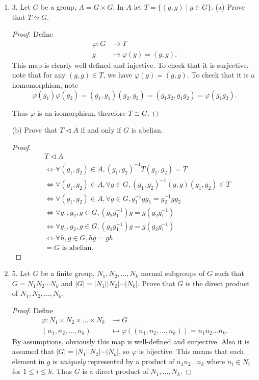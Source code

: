 \begin{enumerate}[resume]
	\item 3. Let $G$ be a group, $A=G \times G$. In $A$ let $T=\{(g, g) \mid g \in G\}$.
(a) Prove that $T \simeq G$.
\begin{proof}
	Define
	\begin{align*}
		\varphi: G &\longrightarrow T \\
		g &\longmapsto \varphi(g) = (g,g)
	.\end{align*}
	This map is clearly well-defined and injective. To check that it is surjective, note that for any $(g, g) \in T$, we have $\varphi(g) = (g,g)$. To check that it is a homomorphism, note
	\[
		\varphi(g_1)\varphi(g_2) = (g_1,g_1)(g_2,g_2)=(g_1g_2,g_1g_2) = \varphi(g_1g_2)
	.\] 

	Thus $\varphi$ is an isomorphism, therefore $T \cong G$.
\end{proof}

(b) Prove that $T \triangleleft A$ if and only if $G$ is abelian.
\begin{proof}
	\begin{align*}
		& T \triangleleft A\\
		&\iff \forall (g_1,g_2)\in A, (g_1,g_2)^{-1}T (g_1,g_2) = T \\
		&\iff \forall (g_1,g_2)\in A,\forall g \in G,  (g_1,g_2)^{-1}(g,g) (g_1,g_2) \in  T \\
		&\iff \forall (g_1,g_2)\in A,\forall g \in G,  g_1^{-1}gg_1 = g_2^{-1}gg_2 \\
		&\iff \forall g_1,g_2,g \in G,  (g_2g_1^{-1})g = g(g_2g_1^{-1}) \\
		&\iff \forall g_1,g_2,g \in G,  (g_2g_1^{-1})g = g(g_2g_1^{-1}) \\
		&\iff \forall h,g \in G,  hg = gh\\
		&= G \text{ is abelian}
	.\end{align*}
\end{proof}

\item 5. Let $G$ be a finite group, $N_1, N_2, \ldots, N_k$ normal subgroups of $G$ such that $G=N_1 N_2 \cdots N_k$ and $|G|=\left|N_1\right|\left|N_2\right| \cdots\left|N_k\right|$. Prove that $G$ is the direct product of $N_1, N_2, \ldots, N_k$.
\begin{proof}
	Define
	\begin{align*}
		\varphi: N_1\times N_2 \times  \ldots\times N_k &\longrightarrow G \\
		(n_1,n_2,\ldots,n_k) &\longmapsto \varphi((n_1,n_2,\ldots,n_k)) = n_1n_2\ldots n_k
	.\end{align*}
	By assumptions, obviously this map is well-defined and surjective. Also it is assumed that $|G|=\left|N_1\right|\left|N_2\right| \cdots\left|N_k\right|$, so  $\varphi$ is bijective. This means that each element in $g$ is \textit{uniquely} represented by a product of $n_1n_2\ldots n_k$ where $n_i \in N_i$ for $1\le i\le k$. Thus $G$ is a direct product of $N_1, \ldots, N_k$.
\end{proof}


\end{enumerate}
